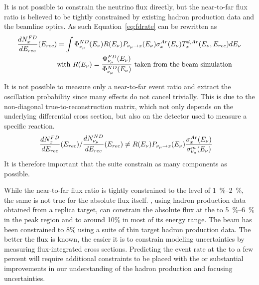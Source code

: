 It is not possible to constrain the  neutrino flux directly, but the near-to-far flux ratio is believed to be tightly constrained by existing hadron production data and the beamline optics. As such Equation~\ref{eq:fdrate} can be rewritten as 
\begin{align}
\frac{dN^{FD}_{x}}{dE_{rec}}(E_{rec}) & = 
\int \Phi^{ND}_{\nu_\mu}(E_\nu)R(E_\nu)P_{\nu_\mu\rightarrow x}(E_\nu)\sigma^{Ar}_x(E_\nu)T^{d,Ar}_x(E_\nu,E_{rec})dE_\nu\\
& \mbox{with } R(E_\nu) = \frac{\Phi^{FD}_{\nu_\mu}(E_\nu)}{\Phi^{ND}_{\nu_\mu}(E_\nu)} \mbox{ taken from the beam simulation} \nonumber
\end{align}

It is not possible to measure only a near-to-far event ratio and extract the oscillation probability since many effects do not cancel trivially.  This is due to the non-diagonal true-to-reconstruction matrix, which not only depends on the underlying differential cross section, but also on the detector used to measure a specific reaction.
\begin{align}
\frac{dN^{FD}_{x}}{dE_{rec}}(E_{rec})/{\frac{dN^{ND}_{\nu_\mu}}{dE_{rec}}(E_{rec})} & \neq  R(E_\nu)P_{\nu_\mu\rightarrow x}(E_\nu)\frac{\sigma^{Ar}_x(E_\nu)}{\sigma^{m}_{\nu_\mu}(E_\nu)}
\end{align}
It is therefore important that the   suite constrain as many components as possible.


While the near-to-far flux ratio is tightly constrained to the level of \SIrange{1}{2}{\%}, the same is not true for the absolute flux itself. , using hadron production data obtained from a replica target, can constrain the absolute flux at the   to \SIrange{5}{6}{\%} in the peak region and to around 10\% in most of its energy range. The  beam has been constrained to 8\% using a suite of thin target hadron production data. The better the  flux is known, the easier it is to constrain modeling uncertainties by measuring flux-integrated cross sections. Predicting the event rate at the   to a few percent will require additional constraints to be placed with the   or substantial improvements in our understanding of the hadron production and focusing uncertainties. 

